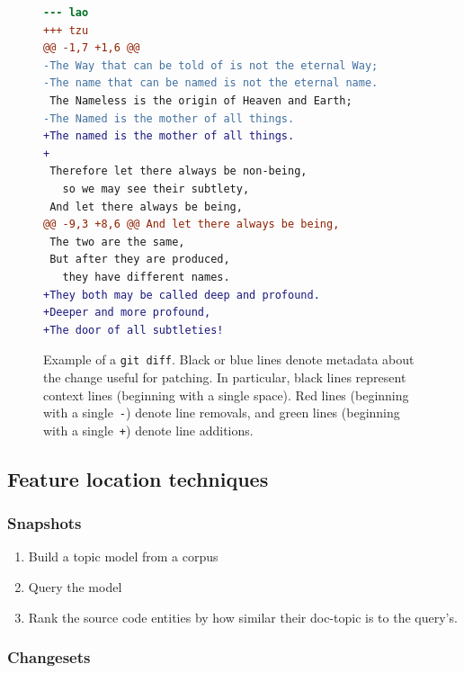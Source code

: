 \begin{figure}[ht]
\centering
\footnotesize
\begin{lstlisting}[language=diff, basicstyle=\ttfamily]
--- lao
+++ tzu
@@ -1,7 +1,6 @@
-The Way that can be told of is not the eternal Way;
-The name that can be named is not the eternal name.
 The Nameless is the origin of Heaven and Earth;
-The Named is the mother of all things.
+The named is the mother of all things.
+
 Therefore let there always be non-being,
   so we may see their subtlety,
 And let there always be being,
@@ -9,3 +8,6 @@ And let there always be being,
 The two are the same,
 But after they are produced,
   they have different names.
+They both may be called deep and profound.
+Deeper and more profound,
+The door of all subtleties!
\end{lstlisting}
\caption{Example of a \texttt{git diff}.
Black or blue lines denote metadata about the change useful for patching.
In particular, black lines represent context lines (beginning with a single space).
Red lines (beginning with a single~\texttt{-}) denote line removals,
and green lines (beginning with a single~\texttt{+}) denote line additions.}
\label{fig:diff}
\vspace{-10pt}
\end{figure}

\subsection{Feature location techniques}
\label{sec:flt}

\subsubsection{Snapshots}

\begin{enumerate}
    \item Build a topic model from a corpus
    \item Query the model
    \item Rank the source code entities by how similar their doc-topic is to the query's.
\end{enumerate}

\subsubsection{Changesets}

